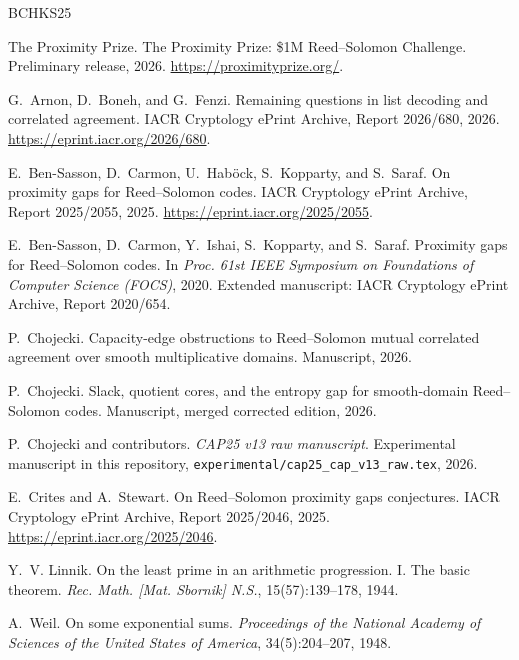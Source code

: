 \documentclass[a4paper,11pt]{amsart}
\theoremstyle{remark}
\begin{document}
\begin{thebibliography}{BCHKS25}

The Proximity Prize.
\newblock The Proximity Prize: \$1M Reed--Solomon Challenge.
\newblock Preliminary release, 2026.
\newblock \url{https://proximityprize.org/}.

G.~Arnon, D.~Boneh, and G.~Fenzi.
\newblock Remaining questions in list decoding and correlated agreement.
\newblock IACR Cryptology ePrint Archive, Report 2026/680, 2026.
\newblock \url{https://eprint.iacr.org/2026/680}.

E.~Ben-Sasson, D.~Carmon, U.~Hab{\"o}ck, S.~Kopparty, and S.~Saraf.
\newblock On proximity gaps for Reed--Solomon codes.
\newblock IACR Cryptology ePrint Archive, Report 2025/2055, 2025.
\newblock \url{https://eprint.iacr.org/2025/2055}.

E.~Ben-Sasson, D.~Carmon, Y.~Ishai, S.~Kopparty, and S.~Saraf.
\newblock Proximity gaps for Reed--Solomon codes.
\newblock In \emph{Proc. 61st IEEE Symposium on Foundations of Computer Science (FOCS)}, 2020.
\newblock Extended manuscript: IACR Cryptology ePrint Archive, Report 2020/654.

P.~Chojecki.
\newblock Capacity-edge obstructions to Reed--Solomon mutual correlated agreement over smooth multiplicative domains.
\newblock Manuscript, 2026.

P.~Chojecki.
\newblock Slack, quotient cores, and the entropy gap for smooth-domain Reed--Solomon codes.
\newblock Manuscript, merged corrected edition, 2026.

P.~Chojecki and contributors.
\newblock \emph{CAP25 v13 raw manuscript}.
\newblock Experimental manuscript in this repository, \texttt{experimental/cap25\_cap\_v13\_raw.tex}, 2026.

E.~Crites and A.~Stewart.
\newblock On Reed--Solomon proximity gaps conjectures.
\newblock IACR Cryptology ePrint Archive, Report 2025/2046, 2025.
\newblock \url{https://eprint.iacr.org/2025/2046}.

Y.~V. Linnik.
\newblock On the least prime in an arithmetic progression. I. The basic theorem.
\newblock \emph{Rec. Math. [Mat. Sbornik] N.S.}, 15(57):139--178, 1944.

A.~Weil.
\newblock On some exponential sums.
\newblock \emph{Proceedings of the National Academy of Sciences of the United States of America}, 34(5):204--207, 1948.


\end{thebibliography}
\end{document}
